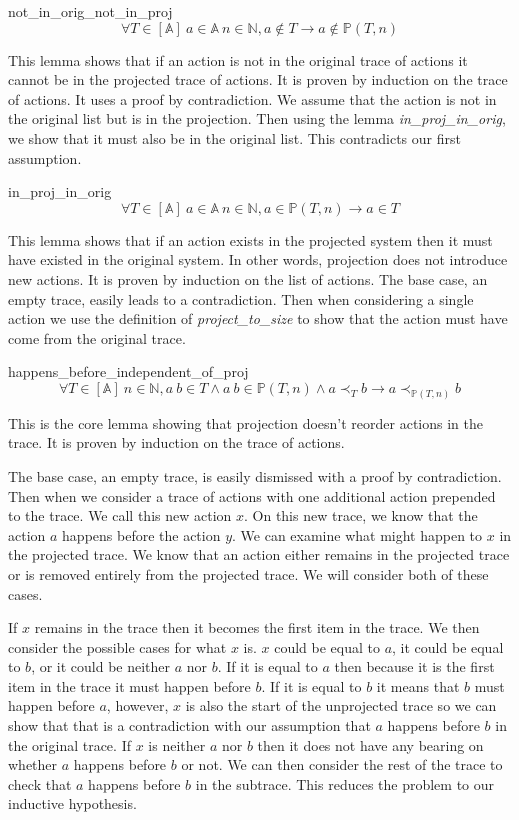 \documentclass[runningheads]{llncs}
\newcommand{\action}{\mathds{A}}
\newcommand{\listaction}{[\action]}
\newcommand{\happensbefore}{\prec_T}
\newcommand{\projectsize}[2]{\mathds{P}(#1, #2)}
\begin{document}
\begin{lemma}{not\_in\_orig\_not\_in\_proj}
$$ \forall T \in \listaction\ a \in \action\ n \in \mathds{N}, a \notin T  \longrightarrow a \notin \projectsize{T}{n} $$
\end{lemma}
This lemma shows that if an action is not in the original trace of actions it cannot be in the projected trace of actions. It is proven by induction on the trace of actions. It uses a proof by contradiction. We assume that the action is not in the original list but is in the projection. Then using the lemma \emph{in\_proj\_in\_orig}, we show that it must also be in the original list. This contradicts our first assumption.

\begin{lemma}{in\_proj\_in\_orig}
$$ \forall T \in \listaction\ a \in \action\ n \in \mathds{N}, a \in \projectsize{T}{n} \longrightarrow  a \in T $$
\end{lemma}
This lemma shows that if an action exists in the projected system then it must have existed in the original system. In other words, projection does not introduce new actions.
 It is proven by induction on the list of actions. The base case, an empty trace, easily leads to a contradiction. Then when considering a single action we use the definition of \emph{project\_to\_size} to show that the action must have come from the original trace. 

\begin{lemma}{happens\_before\_independent\_of\_proj}
$$ \forall T \in \listaction\ n \in \mathds{N},
a\ b \in T \wedge a\ b \in \projectsize{T}{n} \wedge a \happensbefore b \longrightarrow a \prec_{\projectsize{T}{n}} b
$$
\end{lemma}
This is the core lemma showing that projection doesn't reorder actions in the trace. It is proven by induction on the trace of actions. 

The base case, an empty trace, is easily dismissed with a proof by contradiction. 
Then when we consider a trace of actions with one additional action prepended to the trace. We call this new action $x$. On this new trace, we know that the action $a$ happens before the action $y$.
We can examine what might happen to $x$ in the projected trace.
We know that an action either remains in the projected trace or is removed entirely from the projected trace.
We will consider both of these cases.

If $x$ remains in the trace then it becomes the first item in the trace. 
We then consider the possible cases for what $x$ is.
$x$ could be equal to $a$, it could be equal to $b$, or it could be neither $a$ nor $b$.
If it is equal to $a$ then because it is the first item in the trace it must happen before $b$.
If it is equal to $b$ it means that $b$ must happen before $a$, however, $x$ is also the start of the unprojected trace so we can show that that is a contradiction with our assumption that $a$ happens before $b$ in the original trace.
If $x$ is neither $a$ nor $b$ then it does not have any bearing on whether $a$ happens before $b$ or not. We can then consider the rest of the trace to check that $a$ happens before $b$ in the subtrace. This reduces the problem to our inductive hypothesis.
\end{document}
